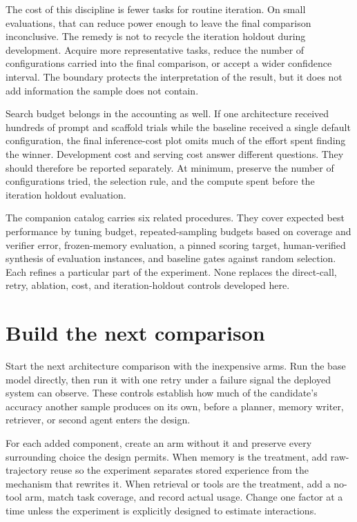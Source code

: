 The cost of this discipline is fewer tasks for routine iteration. On small evaluations, that can reduce power enough to leave the final comparison inconclusive. The remedy is not to recycle the iteration holdout during development. Acquire more representative tasks, reduce the number of configurations carried into the final comparison, or accept a wider confidence interval. The boundary protects the interpretation of the result, but it does not add information the sample does not contain.

Search budget belongs in the accounting as well. If one architecture received hundreds of prompt and scaffold trials while the baseline received a single default configuration, the final inference-cost plot omits much of the effort spent finding the winner. Development cost and serving cost answer different questions. They should therefore be reported separately. At minimum, preserve the number of configurations tried, the selection rule, and the compute spent before the iteration holdout evaluation.

The companion catalog carries six related procedures. They cover expected best performance by tuning budget, repeated-sampling budgets based on coverage and verifier error, frozen-memory evaluation, a pinned scoring target, human-verified synthesis of evaluation instances, and baseline gates against random selection. Each refines a particular part of the experiment. None replaces the direct-call, retry, ablation, cost, and iteration-holdout controls developed here.

\hypertarget{build-the-next-comparison}{%
\section{Build the next comparison}\label{build-the-next-comparison}}

Start the next architecture comparison with the inexpensive arms. Run the base model directly, then run it with one retry under a failure signal the deployed system can observe. These controls establish how much of the candidate's accuracy another sample produces on its own, before a planner, memory writer, retriever, or second agent enters the design.

For each added component, create an arm without it and preserve every surrounding choice the design permits. When memory is the treatment, add raw-trajectory reuse so the experiment separates stored experience from the mechanism that rewrites it. When retrieval or tools are the treatment, add a no-tool arm, match task coverage, and record actual usage. Change one factor at a time unless the experiment is explicitly designed to estimate interactions.

